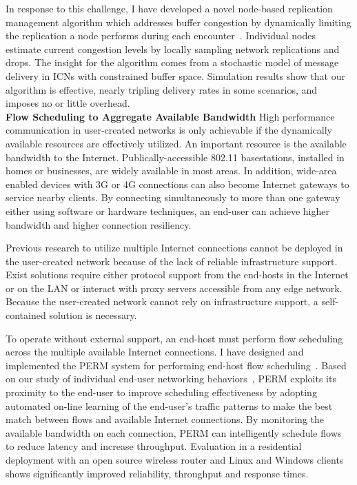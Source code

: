 \documentclass[10pt]{article}
\begin{document}
In response to this challenge, I have developed a novel
node-based replication management algorithm which addresses buffer congestion by
dynamically limiting the
replication a node performs during each encounter~\cite{thompson:cc:infocom10}. 
Individual nodes estimate
current congestion levels by locally sampling network replications and drops.
The insight for the
algorithm comes from a stochastic model of message delivery in ICNs with
constrained buffer space.  
Simulation results show that our algorithm is
effective, nearly tripling delivery rates in some scenarios, and
imposes no or little overhead. \\



\noindent \textbf{Flow Scheduling to Aggregate Available Bandwidth}
High performance communication in user-created networks is only achievable if
the dynamically available resources are effectively utilized.  An important
resource is the available bandwidth to the Internet.  Publically-accessible
802.11 basestations, installed in homes or businesses, are widely available in
most areas.  In addition, wide-area enabled devices with 3G or 4G connections
can also become Internet gateways to service nearby clients.
By connecting simultaneously to more than one gateway either using software or
hardware techniques, an end-user can achieve higher bandwidth and higher
connection resiliency.

Previous research to utilize multiple Internet connections cannot be deployed in
the user-created network because of the lack of reliable infrastructure support.
Exist solutions require either protocol support from the end-hosts in the
Internet or on the LAN or interact with proxy servers accessible from any
edge network.  Because the user-created network cannot rely on infrastructure
support, a self-contained solution is necessary.


To operate without external support, an end-host must perform flow scheduling
across the multiple available Internet connections.  I have designed and
implemented the PERM system for performing end-host flow
scheduling~\cite{thompson:perm:infocom06}.
Based on our study of individual end-user networking
behaviors~\cite{he:traffic:mobihoc05}, PERM 
exploits its proximity to the end-user to improve scheduling effectiveness
by adopting automated on-line learning of the
end-user's traffic patterns to make the best match between flows and available
Internet connections.  
By monitoring the available bandwidth on each connection, PERM can intelligently
schedule flows to reduce latency and increase throughput.
Evaluation in a residential deployment with an open source wireless
router and Linux and Windows clients shows 
significantly improved reliability, throughput and response times.  \\
\end{document}
